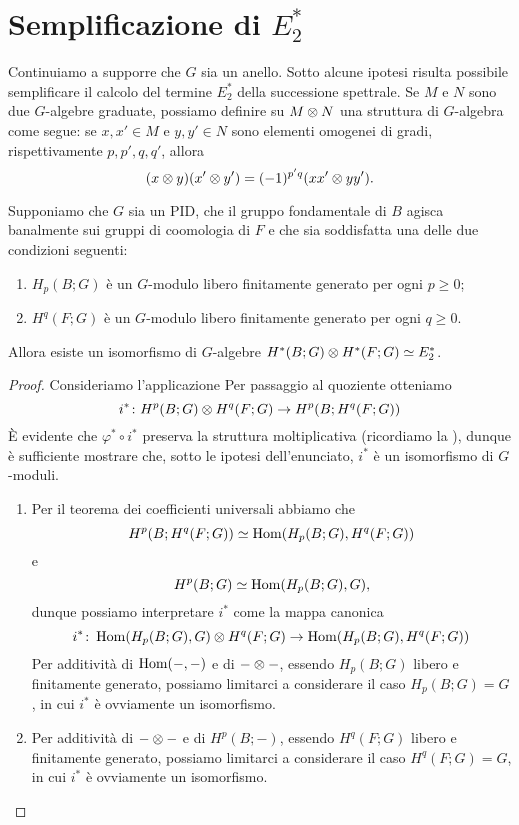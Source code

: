 \section{Semplificazione di \texorpdfstring{$E^*_2$}{E*2}}
Continuiamo a supporre che $G$ sia un anello. Sotto alcune ipotesi risulta possibile semplificare il calcolo del termine $E^\ast_2$ della successione spettrale. Se $M$ e $N$ sono due $G$-algebre graduate, possiamo definire su $M\mathbin{\otimes} N$ una struttura di $G$-algebra come segue: se $x,x'\in M$ e $y,y'\in N$ sono elementi omogenei di gradi, rispettivamente $p,p',q,q'$, allora
$$
(x\mathbin{\otimes} y)(x'\mathbin{\otimes} y')=(-1)^{p'q}(xx'\mathbin{\otimes} yy').
$$
\begin{proposition}
Supponiamo che $G$ sia un PID, che il gruppo fondamentale di $B$ agisca banalmente sui gruppi di coomologia di $F$ e che sia soddisfatta una delle due condizioni seguenti:
\begin{enumerate}
\item $H_p(B;G)$ è un $G$-modulo libero finitamente generato per ogni $p\ge 0$;
\item $H^q(F;G)$ è un $G$-modulo libero finitamente generato per ogni $q\ge 0$.
\end{enumerate}
Allora esiste un isomorfismo di $G$-algebre $H^*(B;G)\mathbin{\otimes} H^*(F;G)\simeq E^\ast_2$.
\end{proposition}
\begin{proof}
Consideriamo l'applicazione
Per passaggio al quoziente otteniamo
$$
i^*\colon H^p(B;G)\mathbin{\otimes} H^q(F;G)\to H^p(B;H^q(F;G))
$$
È evidente che $\varphi^*\circ i^*$ preserva la struttura moltiplicativa (ricordiamo la ), dunque è sufficiente mostrare che, sotto le ipotesi dell'enunciato, $i^*$ è un isomorfismo di $G$-moduli.
\begin{enumerate}
\item Per il teorema dei coefficienti universali abbiamo che
$$
H^p(B;H^q(F;G))\simeq\operatorname{Hom}(H_p(B;G),H^q(F;G))
$$
e
$$
H^p(B;G)\simeq\operatorname{Hom}(H_p(B;G),G),
$$
dunque possiamo interpretare $i^*$ come la mappa canonica
$$
i^*\colon\operatorname{Hom}(H_p(B;G),G)\mathbin{\otimes} H^q(F;G)\to\operatorname{Hom}(H_p(B;G),H^q(F;G))
$$
Per additività di $\operatorname{Hom}(-,-)$ e di $-\mathbin{\otimes}-$, essendo $H_p(B;G)$ libero e finitamente generato, possiamo limitarci a considerare il caso $H_p(B;G)=G$, in cui $i^*$ è ovviamente un isomorfismo.
\item Per additività di $-\mathbin{\otimes}-$ e di $H^p(B;-)$, essendo $H^q(F;G)$ libero e finitamente generato, possiamo limitarci a considerare il caso $H^q(F;G)=G$, in cui $i^*$ è ovviamente un isomorfismo.
\end{enumerate}
\end{proof}


